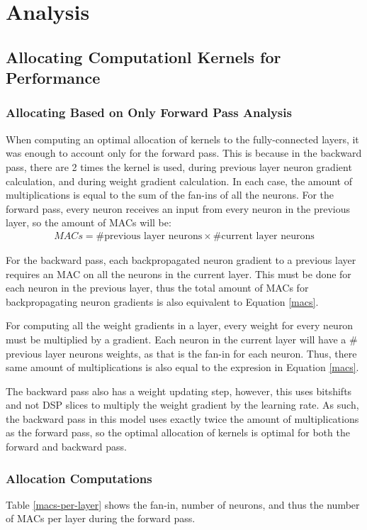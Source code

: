 \chapter{Analysis}\label{analysis}

\section{Allocating Computationl Kernels for Performance}
\subsection{Allocating Based on Only Forward Pass Analysis}
When computing an optimal allocation of kernels to the fully-connected layers, it was enough to account only for the forward pass. This is because in the backward pass, there are 2 times the kernel is used, during previous layer neuron gradient calculation, and during weight gradient calculation. In each case, the amount of multiplications is equal to the sum of the fan-ins of all the neurons. For the forward pass, every neuron receives an input from every neuron in the previous layer, so the amount of MACs will be:
\begin{align}
MACs = \text{\#previous layer neurons} \times \text{\#current layer neurons} \label{macs}
\end{align}

For the backward pass, each backpropagated neuron gradient to a previous layer requires an MAC on all the neurons in the current layer. This must be done for each neuron in the previous layer, thus the total amount of MACs for backpropagating neuron gradients is also equivalent to Equation \ref{macs}.

For computing all the weight gradients in a layer, every weight for every neuron must be multiplied by a gradient. Each neuron in the current layer will have a \# previous layer neurons weights, as that is the fan-in for each neuron. Thus, there same amount of multiplications is also equal to the expresion in Equation \ref{macs}.

The backward pass also has a weight updating step, however, this uses bitshifts and not DSP slices to multiply the weight gradient by the learning rate. As such, the backward pass in this model uses exactly twice the amount of multiplications as the forward pass, so the optimal allocation of kernels is optimal for both the forward and backward pass.

\subsection{Allocation Computations}
Table \ref{macs-per-layer} shows the fan-in, number of neurons, and thus the number of MACs per layer during the forward pass.


